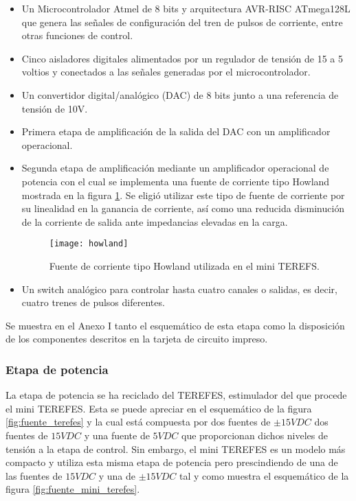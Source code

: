 \begin{itemize}
\item[1)] Un Microcontrolador Atmel de 8 bits y arquitectura AVR-RISC ATmega128L que genera las señales de configuración del tren de pulsos de corriente, entre otras funciones de control.
\item[2)] Cinco aisladores digitales alimentados por un regulador de tensión de 15 a 5 voltios y conectados a las señales generadas por el microcontrolador.
\item[3)] Un convertidor digital/analógico (DAC) de 8 bits junto a una referencia de tensión de 10V.
\item[4)] Primera etapa de amplificación de la salida del DAC con un amplificador operacional.
\item[5)] Segunda etapa de amplificación mediante un amplificador operacional de potencia con el cual se implementa una fuente de corriente tipo Howland mostrada en la figura \ref{fig:howland}. Se eligió utilizar este tipo de fuente de corriente por su linealidad en la ganancia de corriente, así como una reducida disminución de la corriente de salida ante impedancias elevadas en la carga\cite{FES}.\\

\begin{figure}[!htb]
\centering
\texttt{[image: howland]}
  \caption{Fuente de corriente tipo Howland utilizada en el mini TEREFS\cite{FES}.}\label{fig:howland}
\end{figure}

\item[6)] Un switch analógico para controlar hasta cuatro canales o salidas, es decir, cuatro trenes de pulsos diferentes.
\end{itemize}

Se muestra en el Anexo I tanto el esquemático de esta etapa como la disposición de los componentes descritos en la tarjeta de circuito impreso.


\subsubsection{Etapa de potencia}\label{etapa_potencia}
La etapa de potencia se ha reciclado del TEREFES, estimulador del que procede el mini TEREFES. Esta se puede apreciar en el esquemático de la figura \ref{fig:fuente_terefes} y la cual está compuesta por dos fuentes de $\pm15VDC$ dos fuentes de $15VDC$ y una fuente de $5VDC$ que proporcionan dichos niveles de tensión a la etapa de control. Sin embargo, el mini TEREFES es un modelo más compacto y utiliza esta misma etapa de potencia pero prescindiendo de una de las fuentes de $15VDC$ y una de $\pm15VDC$ tal y como muestra el esquemático de la figura \ref{fig:fuente_mini_terefes}.\\

